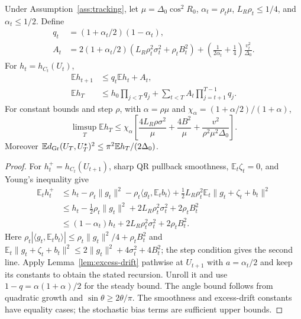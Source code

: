 \begin{theorem}
\label{thm:tracking}
Under Assumption~\ref{ass:tracking}, let
$\mu=\Delta_0\cos^2R_0$, $\alpha_t=\rho_t\mu$,
$L_R\rho_t\le1/4$, and $\alpha_t\le1/2$. Define
\begin{align}
 q_t&=(1+\alpha_t/2)(1-\alpha_t),\\
 A_t&=2(1+\alpha_t/2)
                 (L_R\rho_t^2\sigma_t^2+\rho_tB_t^2)
                  +\left(\frac1{2\alpha_t}+\frac14\right)
                                      \frac{v_t^2}{\Delta_0}.
\end{align}
For $h_t=h_{C_t}(U_t)$,
\begin{align}
 \mathbb E h_{t+1}&\le q_t\mathbb E h_t+A_t,
 \label{eq:tracking-recursion}\\
 \mathbb E h_T&\le h_0\prod_{j<T}q_j+
                  \sum_{t<T}A_t\prod_{j=t+1}^{T-1}q_j.
 \label{eq:tracking-unrolled}
\end{align}
For constant bounds and step $\rho$, with
$\alpha=\rho\mu$ and $\chi_\alpha=(1+\alpha/2)/(1+\alpha)$,
\begin{equation}
 \limsup_T\mathbb E h_T\le\chi_\alpha\left[
       \frac{4L_R\rho\sigma^2}{\mu}+\frac{4B^2}{\mu}
                      +\frac{v^2}{\rho^2\mu^2\Delta_0}\right].
 \label{eq:tracking-floor}
\end{equation}
Moreover $\mathbb E d_{\rm Gr}(U_T,U_T^\star)^2
\le\pi^2\mathbb Eh_T/(2\Delta_0)$.
\end{theorem}
\begin{proof}
For $h_t^+=h_{C_t}(U_{t+1})$, sharp QR pullback smoothness,
$\mathbb E_t\zeta_t=0$, and Young's inequality give
\begin{align}
 \mathbb E_t h_t^+
 &\le h_t-\rho_t\|g_t\|^2
       -\rho_t\langle g_t,\mathbb E_tb_t\rangle
       +\tfrac12L_R\rho_t^2\mathbb E_t\|g_t+\zeta_t+b_t\|^2\\
 &\le h_t-\tfrac12\rho_t\|g_t\|^2
                          +2L_R\rho_t^2\sigma_t^2+2\rho_tB_t^2\\
 &\le(1-\alpha_t)h_t+2L_R\rho_t^2\sigma_t^2+2\rho_tB_t^2.
 \label{eq:frozen-tracking}
\end{align}
Here $\rho_t|\langle g_t,\mathbb E_tb_t\rangle|
\le\rho_t\|g_t\|^2/4+\rho_tB_t^2$ and
$\mathbb E_t\|g_t+\zeta_t+b_t\|^2
\le2\|g_t\|^2+4\sigma_t^2+4B_t^2$; the step condition gives the
second line. Apply Lemma~\ref{lem:excess-drift} pathwise at $U_{t+1}$
with $a=\alpha_t/2$ and keep its constants to obtain the stated recursion.
Unroll it and use $1-q=\alpha(1+\alpha)/2$ for the steady bound.
The angle bound follows from quadratic growth and
$\sin\theta\ge2\theta/\pi$. The smoothness and excess-drift constants
have equality cases; the stochastic bias terms are sufficient upper bounds.
\end{proof}

